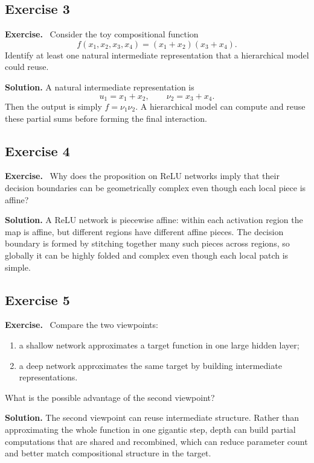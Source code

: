 \documentclass[11pt]{article}
\newenvironment{exercisebox}{\begin{framed}\noindent\textbf{Exercise.}\ }{\end{framed}}
\begin{document}
\subsection*{Exercise 3}
\begin{exercisebox}
Consider the toy compositional function
\[
f(x_1,x_2,x_3,x_4)=(x_1+x_2)(x_3+x_4).
\]
Identify at least one natural intermediate representation that a hierarchical model could reuse.
\end{exercisebox}
\textbf{Solution.} A natural intermediate representation is
\[
u_1=x_1+x_2,\qquad \nu_2=x_3+x_4.
\]
Then the output is simply $f=\nu_1\nu_2$. A hierarchical model can compute and reuse these partial sums before forming the final interaction.

\subsection*{Exercise 4}
\begin{exercisebox}
Why does the proposition on ReLU networks imply that their decision boundaries can be geometrically complex even though each local piece is affine?
\end{exercisebox}
\textbf{Solution.} A ReLU network is piecewise affine: within each activation region the map is affine, but different regions have different affine pieces. The decision boundary is formed by stitching together many such pieces across regions, so globally it can be highly folded and complex even though each local patch is simple.

\subsection*{Exercise 5}
\begin{exercisebox}
Compare the two viewpoints:
\begin{enumerate}
    \item a shallow network approximates a target function in one large hidden layer;
    \item a deep network approximates the same target by building intermediate representations.
\end{enumerate}
What is the possible advantage of the second viewpoint?
\end{exercisebox}
\textbf{Solution.} The second viewpoint can reuse intermediate structure. Rather than approximating the whole function in one gigantic step, depth can build partial computations that are shared and recombined, which can reduce parameter count and better match compositional structure in the target.
\end{document}
